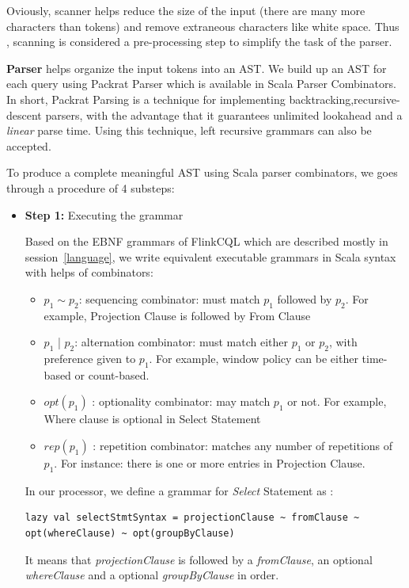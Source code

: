 Oviously, scanner helps reduce the size of the input (there are many more characters than tokens) and remove extraneous characters like white space. Thus  , scanning is considered a pre-processing step to simplify the task of the parser.

\textbf{Parser} helps organize the input tokens into an AST. We build up an AST for each query using Packrat Parser which is available in Scala Parser Combinators. 
In short, Packrat Parsing is a technique for implementing backtracking,recursive-descent parsers, with the advantage that it guarantees unlimited lookahead and a \textit{linear} parse time. Using this technique, left recursive grammars can also be accepted.

To produce a complete meaningful AST using Scala parser combinators, we goes through a procedure of 4 substeps:
\begin{itemize}

\item \textbf{Step 1:} Executing the grammar

Based on the EBNF grammars of FlinkCQL which are described mostly in session~\ref{language}, we write equivalent executable grammars in Scala syntax with helps of combinators:
\begin{itemize}
	\item $p_1 \sim p_2$: sequencing combinator: must match $p_1$ followed by $p_2$. For example, Projection Clause is followed by From Clause
	\item $p_1$ | $p_2$: alternation combinator: must match either $p_1$ or $p_2$, with preference given to $p_1$. For example, window policy can be either time-based or count-based.
	\item $opt(p_1)$ : optionality combinator: may match $p_1$ or not. For example, Where clause is optional in Select Statement
	\item $rep(p_1)$ : repetition combinator: matches any number of repetitions of $p_1$. For instance: there is one or more entries in Projection Clause.
\end{itemize} 

In our processor, we define a grammar for \textit{Select} Statement as :
\begin{lstlisting}
lazy val selectStmtSyntax = projectionClause ~ fromClause ~ opt(whereClause) ~ opt(groupByClause)
\end{lstlisting}
It means that \textit{projectionClause} is followed by a \textit{fromClause}, an optional \textit{whereClause} and a optional \textit{groupByClause} in order.


\end{itemize}
